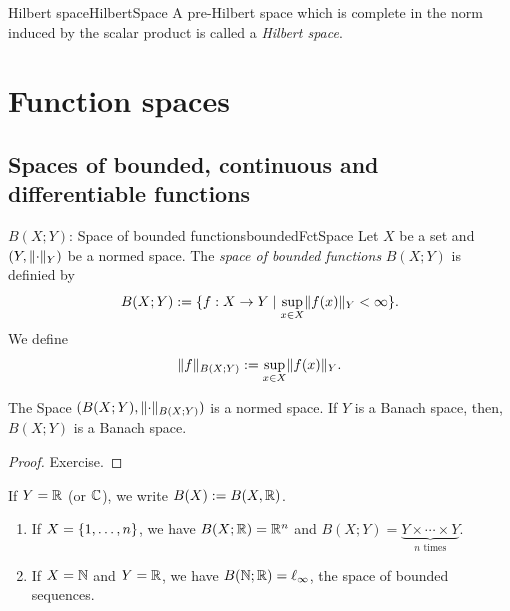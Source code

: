 \documentclass[language=english]{../../Template/TemplateLecture}
\begin{document}
\begin{defi}{Hilbert space}{HilbertSpace}
    A pre-Hilbert space which is complete in the norm induced by the scalar product is called a \emph{Hilbert space}.
\end{defi}

\chapter{Function spaces}
\section{Spaces of bounded, continuous and differentiable functions}
\begin{defi}{$B(X; Y)$: Space of bounded functions}{boundedFctSpace}
    Let $X$ be a set and $(Y, \lVert\cdot\rVert_Y)$ be a normed space. The \emph{space of bounded functions} $B(X;Y)$ is definied by 
    \begin{equation}
        B(X; Y) := \{f: X \to Y \mid \sup_{x \in X} \lVert f(x)\rVert_Y < \infty\}.
    \end{equation}
    We define 
    \begin{equation}
        \lVert f\rVert_{B(X;Y)} := \sup_{x \in X} \lVert f(x)\rVert_Y.
    \end{equation}
\end{defi}

\begin{prop}
    The Space $(B(X;Y), \lVert\cdot\rVert_{B(X;Y)})$ is a normed space. If $Y$ is a Banach space, then, $B(X;Y)$ is a Banach space.
\end{prop}
\begin{proof}
    Exercise.
\end{proof}
If $Y = \mathbb{R}$ (or $\mathbb{C}$), we write $B(X) := B(X,\mathbb{R})$.

\begin{beispiel}
    \begin{enumerate}[$(i)$]
        \item If $X = \{1,\ldots,n\}$, we have $B(X;\mathbb{R}) = \mathbb{R}^n$ and $B(X;Y) = \underset{\text{$n$ times}}{\underbrace{Y \times \cdots \times Y}}$.
        \item If $X = \mathbb{N}$ and $Y = \mathbb{R}$, we have $B(\mathbb{N}; \mathbb{R}) = \ell_\infty$, the space of bounded sequences.
    \end{enumerate}
\end{beispiel}
\end{document}
